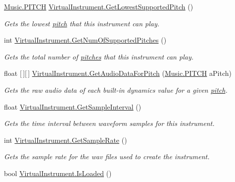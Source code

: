 \begin{DoxyCompactItemize}
\hyperlink{group___music_enums_ga508f69b199ea518f935486c990edac1d}{Music.\+P\+I\+T\+CH} \hyperlink{group___v_i_base_pub_func_gac42b3915bbfec60b83650abd701d0690}{Virtual\+Instrument.\+Get\+Lowest\+Supported\+Pitch} ()
\begin{DoxyCompactList}\small\item\em Gets the lowest \hyperlink{group___music_enums_ga508f69b199ea518f935486c990edac1d}{pitch} that this instrument can play. \end{DoxyCompactList}\item 
int \hyperlink{group___v_i_base_pub_func_ga6ce5a7b3406269ea433be721d7d11177}{Virtual\+Instrument.\+Get\+Num\+Of\+Supported\+Pitches} ()
\begin{DoxyCompactList}\small\item\em Gets the total number of \hyperlink{group___music_enums_ga508f69b199ea518f935486c990edac1d}{pitches} that this instrument can play. \end{DoxyCompactList}\item 
float \mbox{[}$\,$\mbox{]}\mbox{[}$\,$\mbox{]} \hyperlink{group___v_i_base_pub_func_gaf715f7c3bbd2f1a2fa543b2f0684f8a6}{Virtual\+Instrument.\+Get\+Audio\+Data\+For\+Pitch} (\hyperlink{group___music_enums_ga508f69b199ea518f935486c990edac1d}{Music.\+P\+I\+T\+CH} a\+Pitch)
\begin{DoxyCompactList}\small\item\em Gets the raw audio data of each built-\/in dynamics value for a given \hyperlink{group___music_enums_ga508f69b199ea518f935486c990edac1d}{pitch}. \end{DoxyCompactList}\item 
float \hyperlink{group___v_i_base_pub_func_gabea22c3ab14c6989b9357da0bf052fbc}{Virtual\+Instrument.\+Get\+Sample\+Interval} ()
\begin{DoxyCompactList}\small\item\em Gets the time interval between waveform samples for this instrument. \end{DoxyCompactList}\item 
int \hyperlink{group___v_i_base_pub_func_ga8be9d452abaf025dc7270c36b3cf379a}{Virtual\+Instrument.\+Get\+Sample\+Rate} ()
\begin{DoxyCompactList}\small\item\em Gets the sample rate for the wav files used to create the instrument. \end{DoxyCompactList}\item 
bool \hyperlink{group___v_i_base_pub_func_gae8b5ac2e3402dfc50ea43f0e91fd9a29}{Virtual\+Instrument.\+Is\+Loaded} ()

\end{DoxyCompactItemize}
